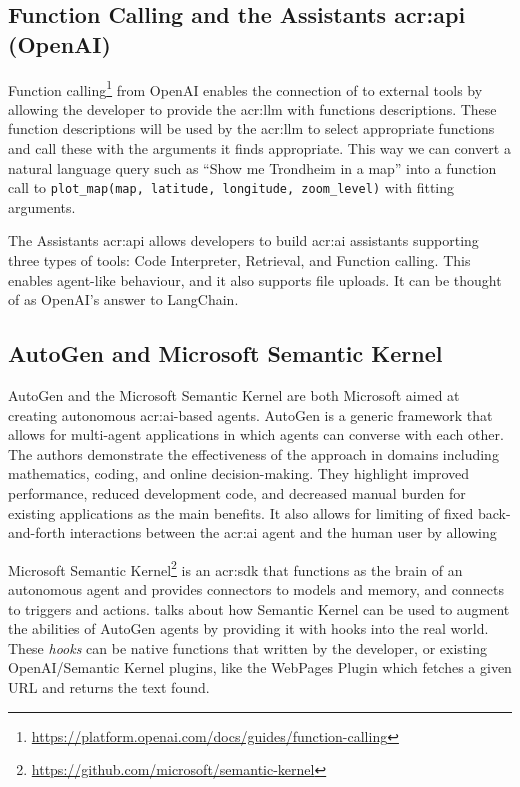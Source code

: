 \subsection[Function Calling and the Assistants API (OpenAI)]{Function Calling and the Assistants \acrshort{acr:api} (OpenAI)}

Function calling\footnote{\url{https://platform.openai.com/docs/guides/function-calling}} from OpenAI enables the connection of  to external tools by allowing the developer to provide the \acrshort{acr:llm} with functions descriptions. These function descriptions will be used by the \acrshort{acr:llm} to select appropriate functions and call these with the arguments it finds appropriate. This way we can convert a natural language query such as \enquote{Show me Trondheim in a map} into a function call to \texttt{plot\_map(map, latitude, longitude, zoom\_level)} with fitting arguments.

The Assistants \acrshort{acr:api} allows developers to build \acrshort{acr:ai} assistants supporting three types of tools: Code Interpreter, Retrieval, and Function calling. This enables agent-like behaviour, and it also supports file uploads. It can be thought of as OpenAI's answer to LangChain.

\subsection{AutoGen and Microsoft Semantic Kernel}\label{subsubsec:microsoft-semantic-kernel}

AutoGen and the Microsoft Semantic Kernel are both Microsoft aimed at creating autonomous \acrshort{acr:ai}-based agents. AutoGen \cite{wuAutoGenEnablingNextGen2023} is a generic framework that allows for multi-agent applications in which agents can converse with each other. The authors demonstrate the effectiveness of the approach in domains including mathematics, coding, and online decision-making. They highlight improved performance, reduced development code, and decreased manual burden for existing applications as the main benefits. It also allows for limiting of fixed back-and-forth interactions between the \acrshort{acr:ai} agent and the human user by allowing

Microsoft Semantic Kernel\footnote{\url{https://github.com/microsoft/semantic-kernel}} is an \acrshort{acr:sdk} that functions as the brain of an autonomous agent and provides connectors to models and memory, and connects to triggers and actions. \cite{maedaAutoGenAgentsMeet2023} talks about how Semantic Kernel can be used to augment the abilities of AutoGen agents by providing it with hooks into the real world. These \textit{hooks} can be native functions that written by the developer, or existing OpenAI/Semantic Kernel plugins, like the WebPages Plugin which fetches a given URL and returns the text found.



